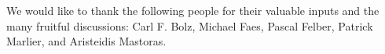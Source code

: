\documentclass{sigplanconf}
\begin{document}


\acks
We would like to thank the following people for their valuable
inputs and the many fruitful discussions: Carl F. Bolz, Michael Faes,
Pascal Felber, Patrick Marlier, and Aristeidis Mastoras.





\end{document}
